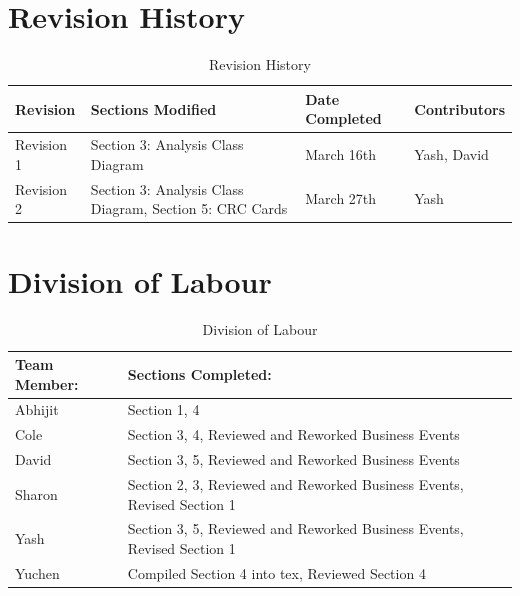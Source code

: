 \documentclass[12pt]{article}
\begin{document}
\section{Revision History}
\begin{table}[ht]
	\centering
	\begin{tabular}{|p{2cm}|p{5cm}|p{3cm}|p{3cm}|}
		\hline
		\textbf{Revision} & \textbf{Sections Modified} & \textbf{Date Completed} & \textbf{Contributors}\\
		\hline
		Revision 1 & Section 3: Analysis Class Diagram & March 16th & Yash, David\\
		\hline
		Revision 2 & Section 3: Analysis Class Diagram, Section 5: CRC Cards & March 27th & Yash\\
		\hline
	\end{tabular}
	\caption{Revision History}
	\label{table:1}
\end{table}
\section{Division of Labour}
\label{sec:division_of_labour}
\begin{table}[ht]
	\centering
	\begin{tabular}{|p{5cm}|p{5cm}|}
		\hline
		\textbf{Team Member:} & \textbf{Sections Completed:}\\
		\hline
		Abhijit & Section 1, 4\\
		\hline
		Cole & Section 3, 4, Reviewed and Reworked Business Events\\
		\hline
		David & Section 3, 5, Reviewed and Reworked Business Events\\
		\hline
		Sharon & Section 2, 3, Reviewed and Reworked Business Events, Revised Section 1\\
		\hline
		Yash & Section 3, 5, Reviewed and Reworked Business Events, Revised Section 1\\
		\hline
		Yuchen & Compiled Section 4 into tex, Reviewed Section 4\\
		\hline
	\end{tabular}
	\caption{Division of Labour}
	\label{table:1}
\end{table}
\end{document}
